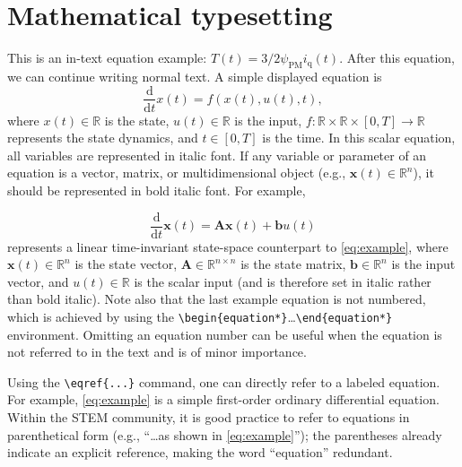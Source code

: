 \section{Mathematical typesetting}
\label{subsec:normalization}
This is an in-text equation example: $T(t)=3/2\psi_{\mathrm{PM}}i_{\mathrm{q}}(t)$. After this equation, we can continue writing normal text. A simple displayed equation is
\begin{equation}
	\label{eq:example}
	\frac{\mathrm{d}}{\mathrm{d}t}x(t) = f(x(t),u(t),t),
\end{equation}
where $x(t)\in\mathbb{R}$ is the state, $u(t)\in\mathbb{R}$ is the input, $f\colon\mathbb{R}\times\mathbb{R}\times[0,T]\to\mathbb{R}$ represents the state dynamics, and $t\in\left[0,T\right]$ is the time. In this scalar equation, all variables are represented in italic font. If any variable or parameter of an equation is a vector, matrix, or multidimensional object (e.g., $\bm{x}(t)\in\mathbb{R}^n$), it should be represented in bold italic font. For example,

\begin{equation*}
	\frac{\mathrm{d}}{\mathrm{d}t}\bm{x}(t) = \bm{A}\bm{x}(t) + \bm{b}u(t)
\end{equation*}
represents a linear time-invariant state-space counterpart to \eqref{eq:example}, where $\bm{x}(t)\in\mathbb{R}^n$ is the state vector, $\bm{A}\in\mathbb{R}^{n\times n}$ is the state matrix, $\bm{b}\in\mathbb{R}^{n}$ is the input vector, and $u(t)\in\mathbb{R}$ is the scalar input (and is therefore set in italic rather than bold italic). Note also that the last example equation is not numbered, which is achieved by using the \verb|\begin{equation*}|\ldots\verb|\end{equation*}| environment. Omitting an equation number can be useful when the equation is not referred to in the text and is of minor importance.

\begin{infobox}[title={Referring to equations}]
	Using the \verb|\eqref{...}| command, one can directly refer to a labeled equation. For example, \eqref{eq:example} is a simple first-order ordinary differential equation. Within the STEM community, it is good practice to refer to equations in parenthetical form (e.g., \enquote{\ldots as shown in \eqref{eq:example}}); the parentheses already indicate an explicit reference, making the word \enquote{equation} redundant.
\end{infobox}

